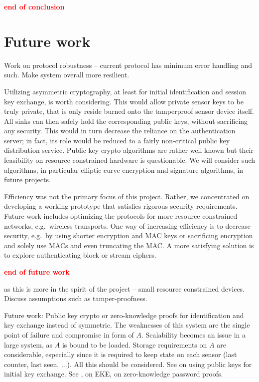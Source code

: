 \textcolor{red}{\bf end of conclusion}
\vspace{30mm}


\section{Future work}

Work on protocol robustness -- current protocol has minimum error handling and such. Make system overall more resilient.

Utilizing asymmetric cryptography, at least for initial identification and session key exchange, is worth considering. This would allow private sensor keys to be truly private, that is only reside burned onto the tamperproof sensor device itself. All sinks can then safely hold the corresponding public keys, without sacrificing any security. This would in turn decrease the reliance on the authentication server; in fact, its role would be reduced to a fairly non-critical public key distribution service. Public key crypto algorithms are rather well known but their feasibility on resource constrained hardware is questionable. We will consider such algorithms, in particular elliptic curve encryption and signature algorithms, in future projects.

Efficiency was not the primary focus of this project. Rather, we concentrated on developing a working prototype that satisfies rigorous security requirements. Future work includes optimizing the protocols for more resource constrained networks, e.g.\ wireless transports. One way of increasing efficiency is to decrease security, e.g.\ by using shorter encryption and MAC keys or sacrificing encryption and solely use MACs and even truncating the MAC. A more satisfying solution is to explore authenticating block or stream ciphers. 


\textcolor{red}{\bf end of future work}

as this is more in the spirit of the project -- small resource constrained devices. Discuss assumptions such as tamper-proofness.

Future work: Public key crypto or zero-knowledge proofs for identification and key exchange instead of symmetric. The weaknesses of this system are the single point of failure and compromise in form of $A$. Scalability becomes an issue in a large system, as $A$ is bound to be loaded. Storage requirements on $A$ are considerable, especially since it is required to keep state on each sensor (last counter, last seen, ...). All this should be considered. See \cite{rfc-4556-2006} on using public keys for initial key exchange.
See \cite{bellovin1992}, \cite{bellovin1993} on EKE, \cite{wu1997} on zero-knowledge password proofs. 

